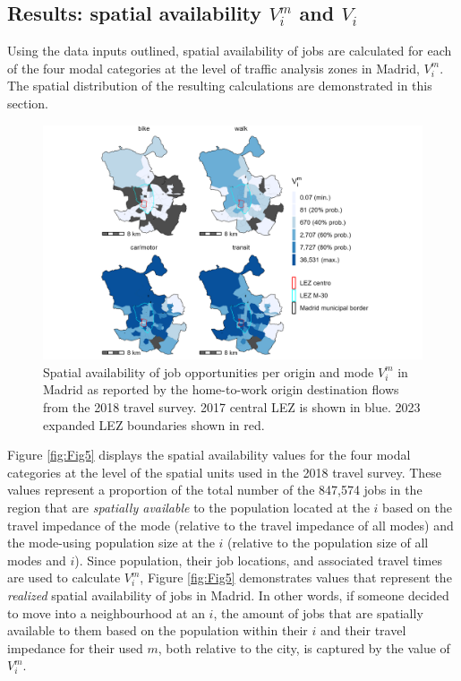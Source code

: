 \documentclass[]{trbunofficial}
\begin{document}
\hypertarget{results-spatial-availability-v_im-and-v_i}{%
\subsection{\texorpdfstring{Results: spatial availability \(V_i^m\) and
\(V_i\)}{Results: spatial availability V\_i\^{}m and V\_i}}\label{results-spatial-availability-v_im-and-v_i}}

Using the data inputs outlined, spatial availability of jobs are
calculated for each of the four modal categories at the level of traffic
analysis zones in Madrid, \(V_i^m\). The spatial distribution of the
resulting calculations are demonstrated in this section.

\begin{figure}

{\centering \includegraphics[width=1\linewidth]{images/SA_im_V_zn208_plot} 

}

\caption{\label{fig:Fig5} Spatial availability of job opportunities per origin and mode $V_i^m$ in Madrid as reported by the home-to-work origin destination flows from the 2018 travel survey. 2017 central LEZ is shown in blue. 2023 expanded LEZ boundaries shown in red.}\label{fig:SA-m-plot}
\end{figure}

Figure \ref{fig:Fig5} displays the spatial availability values for the
four modal categories at the level of the spatial units used in the 2018
travel survey. These values represent a proportion of the total number
of the 847,574 jobs in the region that are \emph{spatially available} to
the population located at the \(i\) based on the travel impedance of the
mode (relative to the travel impedance of all modes) and the mode-using
population size at the \(i\) (relative to the population size of all
modes and \(i\)). Since population, their job locations, and associated
travel times are used to calculate \(V_i^m\), Figure \ref{fig:Fig5}
demonstrates values that represent the \emph{realized} spatial
availability of jobs in Madrid. In other words, if someone decided to
move into a neighbourhood at an \(i\), the amount of jobs that are
spatially available to them based on the population within their \(i\)
and their travel impedance for their used \(m\), both relative to the
city, is captured by the value of \(V_i^m\).
\end{document}
